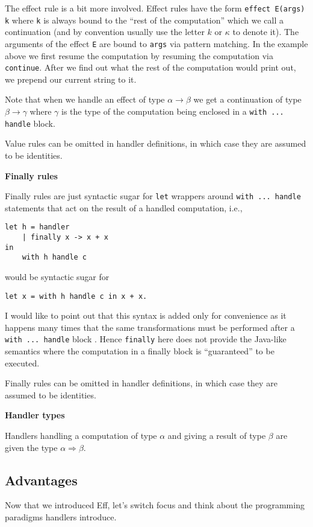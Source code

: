 \documentclass[class=article,crop=false,11pt]{standalone}
\begin{document}
The effect rule is a bit more involved. Effect rules have the form \verb|effect E(args) k| where \verb|k| is always bound to the ``rest of the computation'' which we call a continuation (and by convention
usually use the letter $k$ or $\kappa$ to denote it). The arguments of the effect \verb|E| are bound to \verb|args| via pattern matching. In the example above we first resume the computation by resuming the
computation via \verb|continue|. After we find out what the rest of the computation would print out, we prepend our current string to it.

Note that when we handle an effect of type $\alpha \to \beta$ we get a continuation of type $\beta \to \gamma$ where $\gamma$ is the type of the computation being enclosed in a \verb|with ... handle| block.

Value rules can be omitted in handler definitions, in which case they are assumed to be identities.

\textbf{Finally rules}

Finally rules are just syntactic sugar for \verb|let| wrappers around \verb|with ... handle| statements that act on the result of a handled computation, i.e.,
\begin{verbatim}
let h = handler
    | finally x -> x + x
in 
    with h handle c
\end{verbatim}
would be syntactic sugar for
\begin{verbatim}
let x = with h handle c in x + x.
\end{verbatim}

I would like to point out that this syntax is added only for convenience as it happens many times that the same transformations must be performed after a \verb|with ... handle| block \cite{bauer2015programming}. Hence \verb|finally| here does not provide the Java-like semantics where the computation in a finally block is ``guaranteed'' to be executed.

Finally rules can be omitted in handler definitions, in which case they are assumed to be identities.

\textbf{Handler types}

Handlers handling a computation of type $\alpha$ and giving a result of type $\beta$ are given the type $\alpha \Rightarrow \beta$.

\subsection{Advantages}

Now that we introduced Eff, let's switch focus and think about the programming paradigms handlers introduce.
\end{document}
